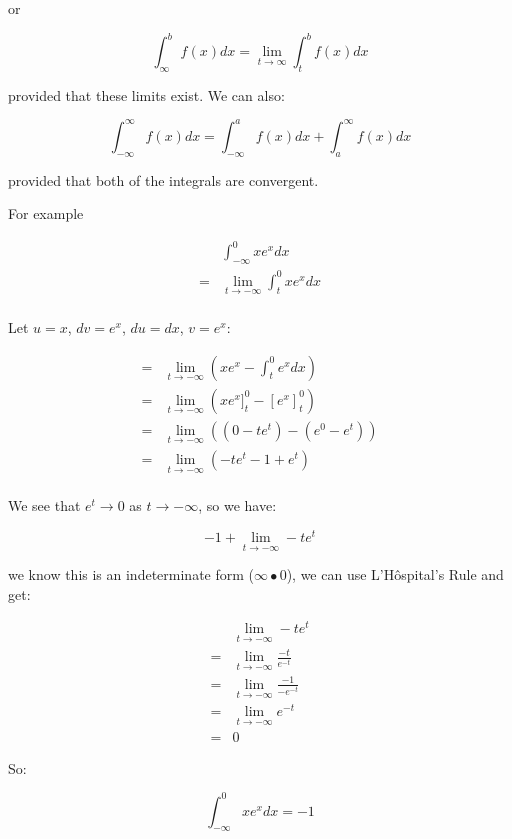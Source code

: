 \documentclass{article}
\begin{document}
or

\[
\int^b_\infty f(x)dx = \lim_{t \to \infty} \int^b_t f(x)dx
\]

provided that these limits exist.  We can also:

\[
\int^\infty_{-\infty} f(x)dx = \int^a_{-\infty}f(x)dx + \int^\infty_a f(x)dx
\]

provided that both of the integrals are convergent.

For example

\begin{align*}
  &\int^0_{-\infty} x e^x dx \\
  = &\lim_{t \to -\infty} \int^0_t x e^x dx \\
\end{align*}

Let $u = x$, $dv = e^x$, $du = dx$, $v = e^x$:

\begin{align*}
  = &\lim_{t \to -\infty} (x e^x - \int^0_t e^x dx) \\
  = &\lim_{t \to -\infty} (xe^x]^0_t - \left[ e^x \right]^0_t) \\
  = &\lim_{t \to -\infty} ((0 - te^t) - (e^0 - e^t)) \\
  = &\lim_{t \to -\infty} (-te^t - 1 + e^t) \\
\end{align*}

\newpage

We see that $e^t \to 0$ as $t \to -\infty$, so we have:

\begin{displaymath}
  -1 + \lim_{t \to -\infty} -te^t 
\end{displaymath}

we know this is an indeterminate form ($\infty \bullet 0$), we
can use L'H\^{o}spital's Rule and get:

\begin{align*}
  &\lim_{t \to -\infty} -te^t \\
  = &\lim_{t \to -\infty} \frac{-t}{e^{-t}} \\
  = &\lim_{t \to -\infty} \frac{-1}{-e^{-t}} \\
  = &\lim_{t \to -\infty} e^{-t} \\
  = &0
\end{align*}

So:

\begin{displaymath}
  \int^0_{-\infty} x e^x dx = -1
\end{displaymath}
\end{document}
